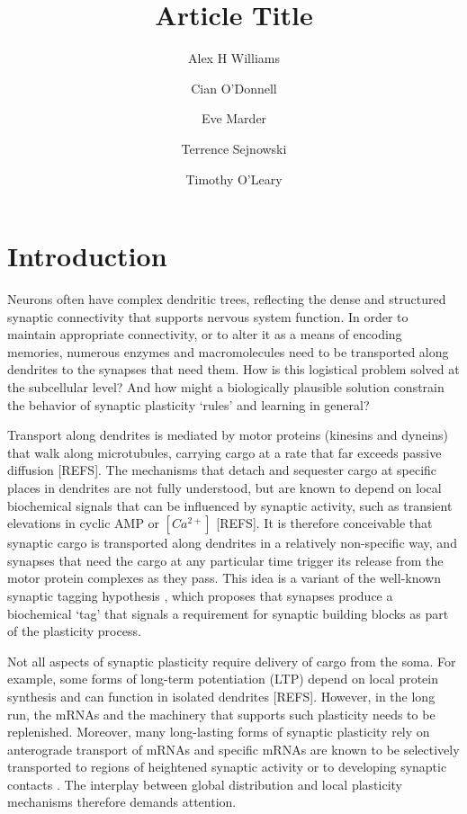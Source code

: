 \documentclass[fleqn,10pt]{wlpeerj}
\title{Article Title}
\author[1,2]{Alex H Williams}
\author[2]{Cian O'Donnell}
\author[3]{Eve Marder}
\author[2]{Terrence Sejnowski}
\author[3]{Timothy O'Leary}
\affil[1]{Stanford University}
\affil[2]{Salk Institute}
\affil[3]{Brandeis University}
\begin{document}
\flushbottom
\maketitle
\thispagestyle{empty}

\section*{Introduction}

Neurons often have complex dendritic trees, reflecting the dense and structured synaptic connectivity that supports nervous system function. In order to maintain appropriate connectivity, or to alter it as a means of encoding memories, numerous enzymes and macromolecules need to be transported along dendrites to the synapses that need them. How is this logistical problem solved at the subcellular level? And how might a biologically plausible solution constrain the behavior of synaptic plasticity `rules' and learning in general?

Transport along dendrites is mediated by motor proteins (kinesins and dyneins) that walk along microtubules, carrying cargo at a rate that far exceeds passive diffusion [REFS]. The mechanisms that detach and sequester cargo at specific places in dendrites are not fully understood, but are known to depend on local biochemical signals that can be influenced by synaptic activity, such as transient elevations in cyclic AMP or $[Ca^{2+}]$ [REFS]. It is therefore conceivable that synaptic cargo is transported along dendrites in a relatively non-specific way, and synapses that need the cargo at any particular time trigger its release from the motor protein complexes as they pass. This idea is a variant of the well-known synaptic tagging hypothesis \citep{Frey_1997}, which proposes that synapses produce a biochemical `tag' that signals a requirement for synaptic building blocks as part of the plasticity process.

Not all aspects of synaptic plasticity require delivery of cargo from the soma. For example, some forms of long-term potentiation (LTP) depend on local protein synthesis and can function in isolated dendrites [REFS]. However, in the long run, the mRNAs and the machinery that supports such plasticity needs to be replenished. Moreover, many long-lasting forms of synaptic plasticity rely on anterograde transport of mRNAs \citep{Kandel_2001,Puthanveettil_2008} and specific mRNAs are known to be selectively transported to regions of heightened synaptic activity \citep{Steward_1998,Steward_2001,Moga_2004} or to developing synaptic contacts \citep{Lyles_2006}. The interplay between global distribution and local plasticity mechanisms therefore demands attention.
\end{document}
